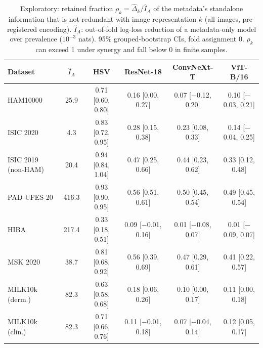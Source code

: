 \begin{table}[tp]\centering\footnotesize
\caption{Exploratory: retained fraction $\rho_k=\hat\Delta_k/\hat I_A$ of the metadata's standalone information that is not redundant with image representation $k$ (all images, pre-registered encoding). $\hat I_A$: out-of-fold log-loss reduction of a metadata-only model over prevalence ($10^{-3}$ nats). 95\% grouped-bootstrap CIs, fold assignment 0. $\rho_k$ can exceed 1 under synergy and fall below 0 in finite samples.}\label{tab:retained}
\begin{tabular}{lccccc}\toprule
Dataset & $\hat I_A$ & HSV & ResNet-18 & ConvNeXt-T & ViT-B/16\\\midrule
HAM10000 & 25.9 & 0.71 [0.60, 0.80] & 0.16 [0.00, 0.27] & 0.07 [\ensuremath{-}0.12, 0.20] & 0.10 [\ensuremath{-}0.03, 0.21]\\
ISIC 2020 & 4.3 & 0.83 [0.72, 0.95] & 0.28 [0.15, 0.38] & 0.23 [0.08, 0.33] & 0.14 [\ensuremath{-}0.04, 0.25]\\
ISIC 2019 (non-HAM) & 20.4 & 0.94 [0.84, 1.04] & 0.47 [0.25, 0.66] & 0.44 [0.23, 0.62] & 0.33 [0.12, 0.48]\\
PAD-UFES-20 & 416.3 & 0.93 [0.90, 0.95] & 0.56 [0.51, 0.61] & 0.50 [0.45, 0.54] & 0.49 [0.45, 0.54]\\
HIBA & 217.4 & 0.33 [0.18, 0.51] & 0.09 [\ensuremath{-}0.01, 0.16] & 0.01 [\ensuremath{-}0.08, 0.07] & 0.01 [\ensuremath{-}0.09, 0.07]\\
MSK 2020 & 38.7 & 0.81 [0.68, 0.92] & 0.56 [0.39, 0.69] & 0.47 [0.29, 0.61] & 0.41 [0.22, 0.57]\\
MILK10k (derm.) & 82.3 & 0.63 [0.58, 0.68] & 0.18 [0.06, 0.26] & 0.10 [0.00, 0.17] & 0.11 [0.00, 0.18]\\
MILK10k (clin.) & 82.3 & 0.71 [0.66, 0.76] & 0.11 [\ensuremath{-}0.01, 0.18] & 0.07 [\ensuremath{-}0.04, 0.14] & 0.12 [0.05, 0.17]\\
\bottomrule\end{tabular}\end{table}
